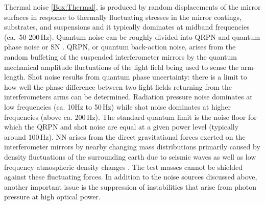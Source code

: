 Thermal noise \ref{Box:Thermal},\cite{ThermalNoiseHammond2014} is produced by random displacements of the mirror surfaces in response to thermally fluctuating stresses in the mirror coatings, substrates, and suspensions and it typically dominates at midband frequencies  (ca.~50-200\,Hz). Quantum noise can be roughly divided into \ac{QRPN} and quantum phase noise or \ac{SN} \cite{QuantumNoiseBarsotti2018}. \ac{QRPN}, or quantum back-action noise, arises from the random buffeting of the suspended interferometer mirrors by the quantum mechanical amplitude fluctuations of the light field being used to sense the arm-length. Shot noise results from quantum phase uncertainty: there is a limit to how well the phase difference between two light fields returning from the interferometers arms can be determined. Radiation pressure noise dominates at low frequencies (ca. 10Hz to 50\,Hz) while shot noise dominates at higher frequencies (above ca. 200\,Hz). The standard quantum limit is the noise floor for which the \ac{QRPN} and shot noise are equal at a given power level (typically around 100\,Hz). 
\Ac*{NN} arises from the direct gravitational forces exerted on the interferometer mirrors by nearby changing mass distributions primarily caused by density fluctuations of the surrounding earth due to seismic waves as well as low frequency atmospheric density changes \cite{InfrasoundNewtonianNoise2018}. 
The test masses cannot be shielded against these fluctuating forces.  In addition to the noise sources discussed above, another important issue is the suppression of instabilities that arise from photon pressure at high optical power. 

